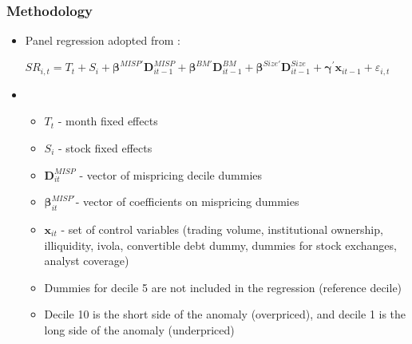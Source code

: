 \documentclass{beamer}
\begin{document}
%	
\begin{frame}
	\frametitle{Methodology}
	\begin{itemize}
		\item Panel regression adopted from \citet{Hanson2014}:
	\end{itemize}
		\begin{equation} \nonumber 
			SR_{i,t} = T_t + S_i+\bm{\beta}^{MISP\prime}  \bm{D}^{MISP}_{it-1} +\bm{\beta}^{BM\prime} \bm{D}^{BM}_{it-1}+\bm{\beta}^{Size\prime}  \bm{D}^{Size}_{it-1}  +\bm{\gamma}^\prime \bm{x}_{it-1} + \varepsilon_{i,t}
		\end{equation}

\begin{itemize}
\item[]
\begin{itemize}
	\item $T_t$ - month fixed effects
	\item $S_i$ - stock fixed effects
	\item $\bm{D}^{MISP}_{it}$ - vector of mispricing decile dummies
	\item $\bm{\beta}^{MISP\prime}_{it}$- vector of coefficients on mispricing dummies
	\item $\bm{x}_{it}$ - set of control variables (trading volume, institutional ownership, illiquidity, ivola, convertible debt dummy, dummies for stock exchanges, analyst coverage)
	\item Dummies for decile 5 are not included in the regression (reference decile)
	\item Decile 10 is the short side of the anomaly (overpriced), and decile 1  is the long side of the anomaly (underpriced)

\end{itemize}
\end{itemize}
\end{frame}  

	
\end{document}
